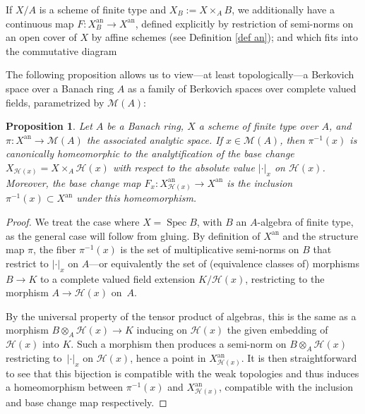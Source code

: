 \documentclass[JEP,XML,SOM,Unicode,published]{cedram}
\let\ts\textstyle
\newtheorem{prop}[equation]{Proposition}
\theoremstyle{definition}
\newcommand \M {\mathscr {M}}
\newcommand{\an}{\mathrm{an}}
\DeclareMathOperator{\Sp}{Spec}
\begin{document}
If $X/A$ is a scheme of finite type and $X_B:= X \times_{A} B$, we additionally have a continuous map $F: X^{\an}_B \to X^{\an}$, defined explicitly by restriction of semi-norms on an open cover of $X$ by affine schemes (see Definition \ref{def an}); and which fits into the commutative diagram
\begin{center}
\end{center}
The following proposition allows us to view---at least topologically---a Berkovich space over a Banach ring $A$ as a family of Berkovich spaces over complete valued fields, parametrized by $\M(A)$:
\begin{prop} \label{prop gbr}
Let $A$ be a Banach ring, $X$ a scheme of finite type over $A$, and $\pi: X^{\an} \to \M(A)$ the associated analytic space. If $x \in \M(A)$, then $\pi^{-1}(x)$ is canonically homeomorphic to the analytification of the base change \hbox{$X_{\mathscr{H}(x)} = X \times_A \mathscr{H}(x)$} with respect to the absolute value $\lvert \cdot \rvert_x$ on $\mathscr{H}(x)$. Moreover, the base change map $F_x: X^{\an}_{\mathscr{H}(x)} \to X^{\an}$ is the inclusion $\pi^{-1}(x) \subset X^{\an}$ under this homeomorphism.
\end{prop}
\begin{proof} We treat the case where $X = \Sp B$, with $B$ an $A$-algebra of finite type, as the general case will follow from gluing. By definition of $X^{\an}$ and the structure map $\pi$, the fiber $\pi^{-1}(x)$ is the set of multiplicative semi-norms on $B$ that restrict to $\lvert \cdot \rvert_x$ on $A$---or equivalently the set of (equivalence classes of) morphisms $B \to K$ to a complete valued field extension $K/\mathscr{H}(x)$, restricting to the morphism $A \to \mathscr{H}(x)$ on~$A$.

By the universal property of the tensor product of algebras, this is the same as a morphism $B \otimes_A \mathscr{H}(x) \to K$ inducing on $\mathscr{H}(x)$ the given embedding of $\mathscr{H}(x)$ into $K$. Such a morphism then produces a semi-norm on $B \otimes_A \mathscr{H}(x)$ restricting to~$\lvert \cdot \rvert_x$ on $\mathscr{H}(x)$, hence a point in $X_{\mathscr{H}(x)}^{\an}$. It is then straightforward to see that this bijection is compatible with the weak topologies and thus induces a homeomorphism between $\pi^{-1}(x)$ and $X^{\an}_{\mathscr{H}(x)}$, compatible with the inclusion and base change map respectively.
\end{proof}
\end{document}
